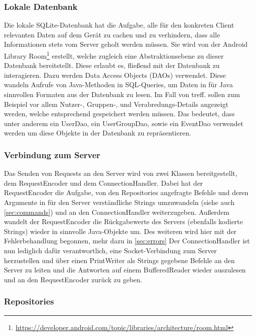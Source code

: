 \documentclass[parskip=full,11pt]{scrartcl}
\begin{document}
\subsubsection{Lokale Datenbank}

Die lokale SQLite-Datenbank hat die Aufgabe, alle für den konkreten Client 
relevanten Daten auf dem Gerät zu cachen und zu verhindern, dass alle 
Informationen stets vom Server geholt werden müssen. 
Sie wird von der Android Library 
Room\footnote{\url{https://developer.android.com/topic/libraries/architecture/room.html}} 
erstellt, welche zugleich eine Abstraktionsebene zu dieser 
Datenbank bereitstellt. Diese erlaubt es, fließend mit der Datenbank zu 
interagieren. Dazu werden Data Access Objects (DAOs) verwendet. Diese 
wandeln Aufrufe von Java-Methoden in SQL-Queries, um Daten in für Java 
sinnvollen Formaten aus der Datenbank zu lesen. Im Fall von treff. sollen zum 
Beispiel vor allem Nutzer-, Gruppen-, und Verabredungs-Details angezeigt 
werden, welche entsprechend gespeichert werden müssen. Das bedeutet, dass unter 
anderem ein UserDao, ein UserGroupDao, sowie ein EventDao verwendet werden um 
diese Objekte in der Datenbank zu repräsentieren.

\subsubsection{Verbindung zum Server}
Das Senden von Requests an den Server wird von zwei Klassen bereitgestellt, dem
RequestEncoder und dem ConnectionHandler. Dabei hat der RequestEncoder die
Aufgabe, von den Repositories angefragte Befehle und deren Argumente in für den
Server verständliche Strings umzuwandeln (siehe auch \ref{sec:commands}) und an
den ConnectionHandler weiterzugeben. Außerdem wandelt der
RequestEncoder die Rückgabewerte des Servers (ebenfalls kodierte Strings)
wieder in sinnvolle Java-Objekte um. Des weiteren wird hier mit der
Fehlerbehandlung begonnen, mehr dazu in \ref{sec:errors} Der ConnectionHandler
ist nun lediglich
dafür verantwortlich, eine Socket-Verbindung zum Server herzustellen und über
einen PrintWriter als Strings gegebene Befehle an den Server zu leiten und die
Antworten auf einem BufferedReader wieder auszulesen und an den RequestEncoder
zurück zu geben.

\subsubsection{Repositories}
\end{document}
